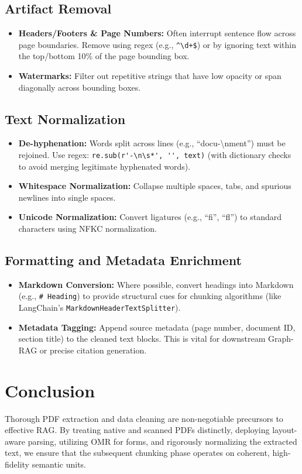 \documentclass[12pt, a4paper]{article}
\begin{document}
\subsection{Artifact Removal}
\begin{itemize}
    \item \textbf{Headers/Footers \& Page Numbers:} Often interrupt sentence flow across page boundaries. Remove using regex (e.g., \verb|^\d+$|) or by ignoring text within the top/bottom 10\% of the page bounding box.
    \item \textbf{Watermarks:} Filter out repetitive strings that have low opacity or span diagonally across bounding boxes.
\end{itemize}

\subsection{Text Normalization}
\begin{itemize}
    \item \textbf{De-hyphenation:} Words split across lines (e.g., ``docu-\textbackslash nment'') must be rejoined. Use regex: \verb|re.sub(r'-\n\s*', '', text)| (with dictionary checks to avoid merging legitimate hyphenated words).
    \item \textbf{Whitespace Normalization:} Collapse multiple spaces, tabs, and spurious newlines into single spaces.
    \item \textbf{Unicode Normalization:} Convert ligatures (e.g., ``\mbox{fi}'', ``\mbox{fl}'') to standard characters using NFKC normalization.
\end{itemize}

\subsection{Formatting and Metadata Enrichment}
\begin{itemize}
    \item \textbf{Markdown Conversion:} Where possible, convert headings into Markdown (e.g., \texttt{\# Heading}) to provide structural cues for chunking algorithms (like LangChain's \texttt{MarkdownHeaderTextSplitter}).
    \item \textbf{Metadata Tagging:} Append source metadata (page number, document ID, section title) to the cleaned text blocks. This is vital for downstream Graph-RAG or precise citation generation.
\end{itemize}

\section{Conclusion}
Thorough PDF extraction and data cleaning are non-negotiable precursors to effective RAG. By treating native and scanned PDFs distinctly, deploying layout-aware parsing, utilizing OMR for forms, and rigorously normalizing the extracted text, we ensure that the subsequent chunking phase operates on coherent, high-fidelity semantic units.
\end{document}
